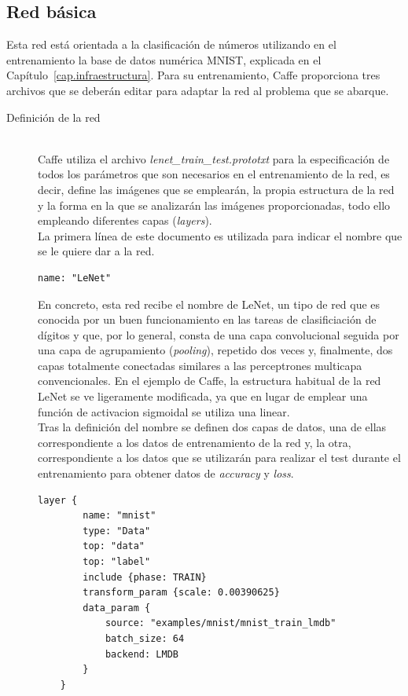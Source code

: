 \subsection{Red básica}
Esta red está orientada a la clasificación de números utilizando en el entrenamiento la base de datos numérica MNIST, explicada en el Capítulo~\ref{cap.infraestructura}. Para su entrenamiento, Caffe proporciona tres archivos que se deberán editar para adaptar la red al problema que se abarque.\\
\begin{description}
	\item[Definición de la red] \hfill \\
	Caffe utiliza el archivo 
	\textit{lenet\_train\_test.prototxt} para la especificación de todos los parámetros que son necesarios en el entrenamiento de la red, es decir, define las imágenes que se emplearán, la propia estructura de la red y la forma en la que se analizarán las imágenes proporcionadas, todo ello empleando diferentes capas (\textit{layers}).\\
	
	La primera línea de este documento es utilizada para indicar el nombre que se le quiere dar a la red.
	\vspace{5pt}
	\begin{lstlisting}[frame=single]
	name: "LeNet"
	\end{lstlisting}
	
	En concreto, esta red recibe el nombre de LeNet, un tipo de red que es conocida por un buen funcionamiento en las tareas de clasificiación de dígitos y que, por lo general, consta de una capa convolucional seguida por una capa de agrupamiento (\textit{pooling}), repetido dos veces y, finalmente, dos capas totalmente conectadas similares a las perceptrones multicapa convencionales. En el ejemplo de Caffe, la estructura habitual de la red LeNet se ve ligeramente modificada, ya que en lugar de emplear una función de activacion sigmoidal se utiliza una linear.\\
	
	Tras la definición del nombre se definen dos capas de datos, una de ellas correspondiente a los datos de entrenamiento de la red y, la otra, correspondiente a los datos que se utilizarán para realizar el test durante el entrenamiento para obtener datos de \textit{accuracy} y \textit{loss}.
	\vspace{5pt}
	\begin{lstlisting}[frame=single]
	layer {
		name: "mnist"
		type: "Data"
		top: "data"
		top: "label"
		include {phase: TRAIN}
		transform_param {scale: 0.00390625}
		data_param {
			source: "examples/mnist/mnist_train_lmdb"
			batch_size: 64
			backend: LMDB
		}
	}
	\end{lstlisting}
	

\end{description}
